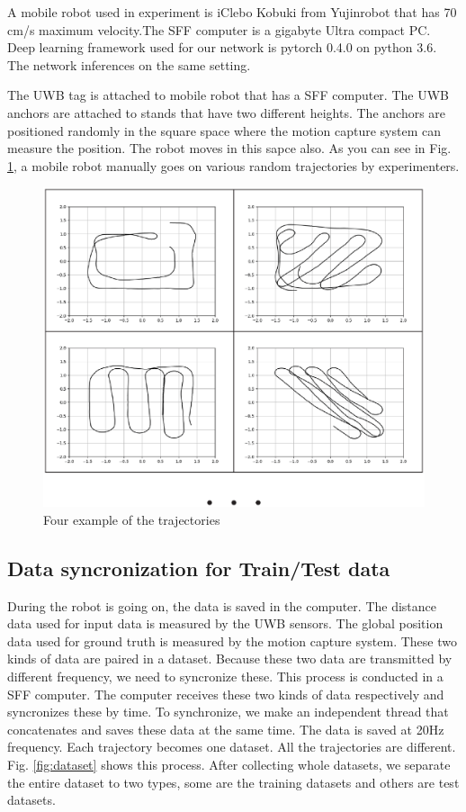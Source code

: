\documentclass{ieeeaccess}
\begin{document}
A mobile robot used in experiment is iClebo Kobuki from Yujinrobot that has 70 cm/s maximum velocity.The SFF computer is a gigabyte Ultra compact PC. Deep learning framework used for our network is pytorch 0.4.0 on python 3.6. The network inferences on the same setting.

The UWB tag is attached to mobile robot that has a SFF computer. The UWB anchors are attached to stands that have two different heights. The anchors are positioned randomly in the square space where the motion capture system can measure the position. The robot moves in this sapce also. As you can see in Fig. \ref{fig:paths}, a mobile robot manually goes on various random trajectories by experimenters.

\begin{figure}[h!]
	\centering
	\includegraphics[width=0.9\linewidth]{paths_1}
	\caption{Four example of the trajectories}
	\label{fig:paths} 
\end{figure}

\subsection{Data syncronization for Train/Test data}
During the robot is going on, the data is saved in the computer. The distance data used for input data is measured by the UWB sensors. The global position data used for ground truth is measured by the motion capture system. These two kinds of data are paired in a dataset. Because these two data are transmitted by different frequency, we need to syncronize these. This process is conducted in a SFF computer. The computer receives these two kinds of data respectively and syncronizes these by time. To synchronize, we make an independent thread that concatenates and saves these data at the same time. The data is saved at 20Hz frequency. Each trajectory becomes one dataset. All the trajectories are different. Fig. \ref{fig:dataset} shows this process. After collecting whole datasets, we separate the entire dataset to two types, some are the training datasets and others are test datasets.
\end{document}
